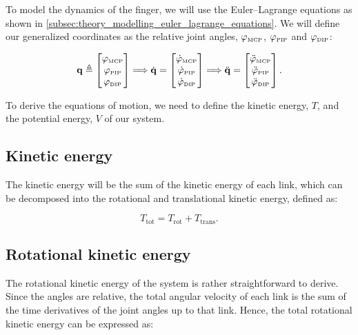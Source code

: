 To model the dynamics of the finger, we will use the Euler--Lagrange equations as shown in \cref{subsec:theory_modelling_euler_lagrange_equations}. We will define our generalized coordinates as the relative joint angles, $\varphi_{{\scriptscriptstyle\mathrm{MCP}}}$, $\varphi_{{\scriptscriptstyle\mathrm{PIP}}}$ and $\varphi_{{\scriptscriptstyle\mathrm{DIP}}}$:

\begin{equation}
    \label{eq:modelling_finger_generalized_coordinates}
    \mathbf{q} \triangleq \begin{bmatrix}
        \varphi_{{\scriptscriptstyle\mathrm{MCP}}} \\
        \varphi_{{\scriptscriptstyle\mathrm{PIP}}} \\
        \varphi_{{\scriptscriptstyle\mathrm{DIP}}}
    \end{bmatrix}
    \Longrightarrow
    \dot{\mathbf{q}} = \begin{bmatrix}
        \dot{\varphi}_{{\scriptscriptstyle\mathrm{MCP}}} \\
        \dot{\varphi}_{{\scriptscriptstyle\mathrm{PIP}}} \\
        \dot{\varphi}_{{\scriptscriptstyle\mathrm{DIP}}}
    \end{bmatrix}
    \Longrightarrow
    \ddot{\mathbf{q}} = \begin{bmatrix}
        \ddot{\varphi}_{{\scriptscriptstyle\mathrm{MCP}}} \\
        \ddot{\varphi}_{{\scriptscriptstyle\mathrm{PIP}}} \\
        \ddot{\varphi}_{{\scriptscriptstyle\mathrm{DIP}}}
    \end{bmatrix}.
\end{equation}

To derive the equations of motion, we need to define the kinetic energy, $T$, and the potential energy, $V$ of our system. 

\subsection{Kinetic energy}
The kinetic energy will be the sum of the kinetic energy of each link, which can be decomposed into the rotational and translational kinetic energy, defined as:

\begin{equation}
    \label{eq:modelling_kinetic_energy_total}
    T_{\text{tot}} = T_{\text{rot}} + T_{\text{trans}}.
\end{equation}

\subsection*{Rotational kinetic energy}

The rotational kinetic energy of the system is rather straightforward to derive. Since the angles are relative, the total angular velocity of each link is the sum of the time derivatives of the joint angles up to that link. Hence, the total rotational kinetic energy can be expressed as:

